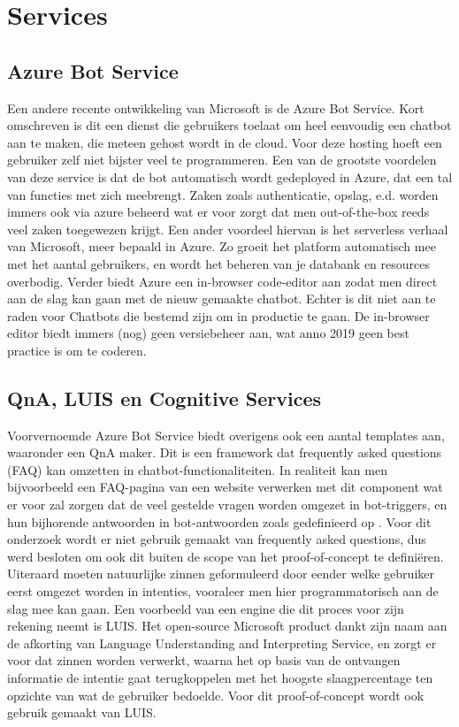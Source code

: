 \section{Services}
\subsection{Azure Bot Service}
Een andere recente ontwikkeling van Microsoft is de Azure Bot Service. Kort omschreven is dit een dienst die gebruikers toelaat om heel eenvoudig een chatbot aan te maken, die meteen gehost wordt in de cloud. Voor deze hosting hoeft een gebruiker zelf niet bijster veel te programmeren. Een van de grootste voordelen van deze service is dat de bot automatisch wordt gedeployed in Azure, dat een tal van functies met zich meebrengt. Zaken zoals authenticatie, opslag, e.d. worden immers ook via azure beheerd wat er voor zorgt dat men out-of-the-box reeds veel zaken toegewezen krijgt. Een ander voordeel hiervan is het serverless verhaal van Microsoft, meer bepaald in Azure. Zo groeit het platform automatisch mee met het aantal gebruikers, en wordt het beheren van je databank en resources overbodig. 
Verder biedt Azure een in-browser code-editor aan zodat men direct aan de slag kan gaan met de nieuw gemaakte chatbot. Echter is dit niet aan te raden voor Chatbots die bestemd zijn om in productie te gaan. De in-browser editor biedt immers (nog) geen versiebeheer aan, wat anno 2019 geen best practice is om te coderen. 

\subsection{QnA, LUIS en Cognitive Services}
Voorvernoemde Azure Bot Service biedt overigens ook een aantal templates aan, waaronder een QnA maker. Dit is een framework dat frequently asked questions (FAQ) kan omzetten in chatbot-functionaliteiten. In realiteit kan men bijvoorbeeld een FAQ-pagina van een website verwerken met dit component wat er voor zal zorgen dat de veel gestelde vragen worden omgezet in bot-triggers, en hun bijhorende antwoorden in bot-antwoorden zoals gedefinieerd op \textcite{Azure2019}. Voor dit onderzoek wordt er niet gebruik gemaakt van frequently asked questions, dus werd besloten om ook dit buiten de scope van het proof-of-concept te definiëren. 
Uiteraard moeten natuurlijke zinnen geformuleerd door eender welke gebruiker eerst omgezet worden in intenties, vooraleer men hier programmatorisch aan de slag mee kan gaan. Een voorbeeld van een engine die dit proces voor zijn rekening neemt is LUIS. Het open-source Microsoft product dankt zijn naam aan de afkorting van Language Understanding and Interpreting Service, en zorgt er voor dat zinnen worden verwerkt, waarna het op basis van de ontvangen informatie de intentie gaat terugkoppelen met het hoogste slaagpercentage ten opzichte van wat de gebruiker bedoelde. Voor dit proof-of-concept wordt ook gebruik gemaakt van LUIS.
